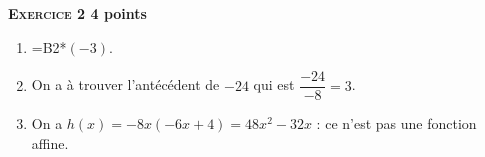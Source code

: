 \textbf{\textsc{Exercice 2} \hfill 4 points}

\medskip

%
%
%

\begin{enumerate}
\item %
=B2*$(- 3)$.
\item %
On a à trouver l'antécédent de $- 24$ qui est $\dfrac{-24}{- 8} = 3$.
\item %

On a $h(x) = - 8x (- 6x + 4) = 48x^2 - 32x$ : ce n'est pas une fonction affine.
\end{enumerate}
\vspace{0.25cm}

